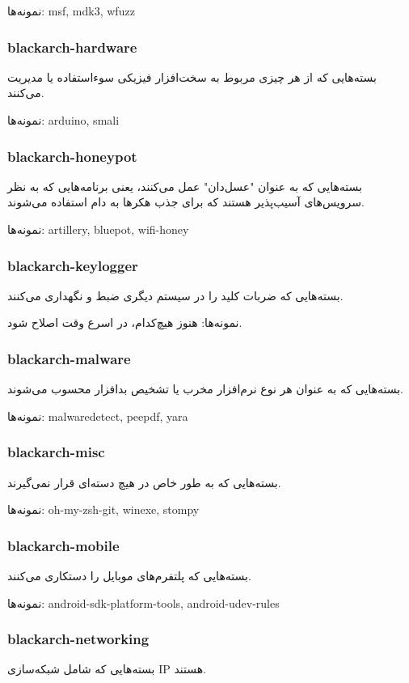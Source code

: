 \documentclass[a4paper, oneside, 11pt]{book}
\begin{document}
نمونه‌ها: msf, mdk3, wfuzz

\subsubsection{blackarch-hardware}
بسته‌هایی که از هر چیزی مربوط به
سخت‌افزار فیزیکی سوءاستفاده یا مدیریت می‌کنند.

نمونه‌ها: arduino, smali

\subsubsection{blackarch-honeypot}
بسته‌هایی که به عنوان "عسل‌دان" عمل می‌کنند، یعنی برنامه‌هایی که به نظر
سرویس‌های آسیب‌پذیر هستند که برای جذب هکرها به دام استفاده می‌شوند.

نمونه‌ها: artillery, bluepot, wifi-honey

\subsubsection{blackarch-keylogger}
بسته‌هایی که ضربات کلید را در سیستم دیگری ضبط و نگهداری می‌کنند.

نمونه‌ها: هنوز هیچ‌کدام، در اسرع وقت اصلاح شود.

\subsubsection{blackarch-malware}
بسته‌هایی که به عنوان هر نوع نرم‌افزار مخرب یا
تشخیص بدافزار محسوب می‌شوند.

نمونه‌ها: malwaredetect, peepdf, yara

\subsubsection{blackarch-misc}
بسته‌هایی که به طور خاص در هیچ دسته‌ای قرار نمی‌گیرند.

نمونه‌ها: oh-my-zsh-git, winexe, stompy

\subsubsection{blackarch-mobile}
بسته‌هایی که پلتفرم‌های موبایل را دستکاری می‌کنند.

نمونه‌ها: android-sdk-platform-tools, android-udev-rules

\subsubsection{blackarch-networking}
بسته‌هایی که شامل شبکه‌سازی IP هستند.
\end{document}
